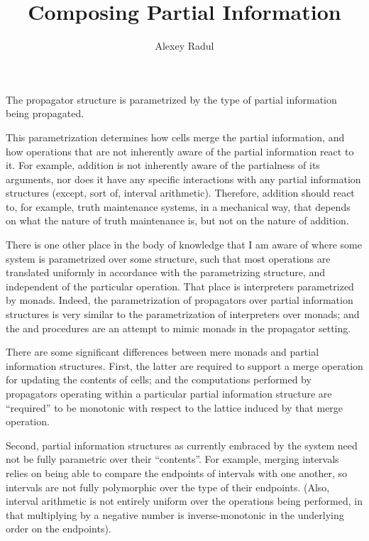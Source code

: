 \documentclass[12pt,letterpaper]{article}
\author{Alexey Radul}
\title{Composing Partial Information}
\begin{document}
\maketitle

The propagator structure is parametrized by the type of partial
information being propagated.

This parametrization determines how cells merge the partial
information, and how operations that are not inherently aware of the
partial information react to it.  For example, addition is not
inherently aware of the partialness of its arguments, nor does it have
any specific interactions with any partial information structures
(except, sort of, interval arithmetic).  Therefore, addition should
react to, for example, truth maintenance systems, in a mechanical way,
that depends on what the nature of truth maintenance is, but not on
the nature of addition.

There is one other place in the body of knowledge that I am aware of
where some system is parametrized over some structure, such that most
operations are translated uniformly in accordance with the
parametrizing structure, and independent of the particular operation.
That place is interpreters parametrized by monads.\cite{?}  Indeed,
the parametrization of propagators over partial information structures
is very similar to the parametrization of interpreters over monads;
and the  and  procedures
are an attempt to mimic monads in the propagator setting.

There are some significant differences between mere monads and partial
information structures.  First, the latter are required to support a
merge operation for updating the contents of cells; and the
computations performed by propagators operating within a particular
partial information structure are ``required'' to be monotonic with
respect to the lattice induced by that merge operation.  

Second, partial information structures as currently embraced by the
system need not be fully parametric over their ``contents''.  For
example, merging intervals relies on being able to compare the
endpoints of intervals with one another, so intervals are not fully
polymorphic over the type of their endpoints.  (Also, interval
arithmetic is not entirely uniform over the operations being
performed, in that multiplying by a negative number is
inverse-monotonic in the underlying order on the endpoints).
\end{document}
